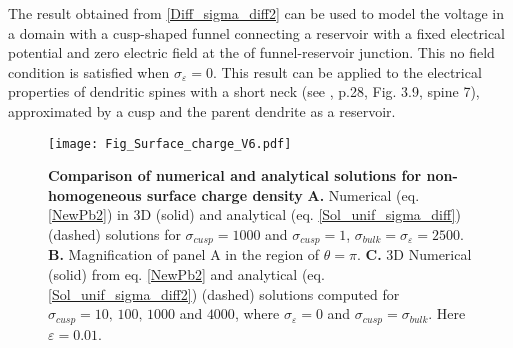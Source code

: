 \documentclass[12pt]{article}
\newcommand{\eps}{\varepsilon}
\begin{document}
{The result obtained from \eqref{Diff_sigma_diff2} can be used to model the voltage in a domain with a cusp-shaped funnel connecting a reservoir with a fixed electrical potential and zero electric field at the of funnel-reservoir junction. This no field condition is satisfied when $\sigma_{ \eps}=0$. This result can be applied to the electrical properties of dendritic spines with a short neck (see \cite{YusteBook}, p.28, Fig. 3.9, spine 7), approximated by a cusp and the parent dendrite as a reservoir.
\begin{figure}[H]
	\center
	\texttt{[image: Fig\_Surface\_charge\_V6.pdf]}
	\caption{ {\small  {\bf Comparison of numerical and analytical solutions for non-homogeneous surface charge density}
	 {\bf A. } Numerical (eq. \eqref{NewPb2}) in 3D (solid) and analytical (eq. \eqref{Sol_unif_sigma_diff})  (dashed) solutions for $\sigma_{cusp}=1000$ and $\sigma_{cusp}=1$, $\sigma_{bulk}=\sigma_{\eps}=2500$.
	 {\bf B. } Magnification of panel A in the region of $\theta=\pi$.
	 {\bf C. } 3D Numerical (solid) from eq. \eqref{NewPb2} and analytical (eq.\eqref{Sol_unif_sigma_diff2}) (dashed) solutions computed for $\sigma_{cusp}=10,\,100, \,1000$ and $4000$, where $\sigma_{\eps}=0$ and $\sigma_{cusp}= \sigma_{bulk}$. Here $\eps=0.01$.
  }\label{f:Surface_part}}
\end{figure}

}
\end{document}
